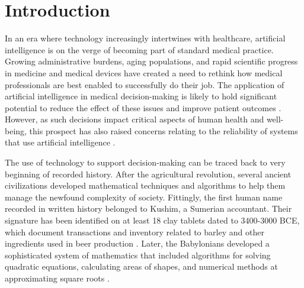 
\chapter[introduction]{Introduction}\label{chp:introduction}
%
%


In an era where technology increasingly intertwines with healthcare, artificial intelligence is on the verge of becoming part of standard medical practice. 
Growing administrative burdens, aging populations, and rapid scientific progress in medicine and medical devices have created a need to rethink how medical professionals are best enabled to successfully do their job. 
The application of artificial intelligence in medical decision-making is likely to hold significant potential to reduce the effect of these issues and improve patient outcomes \parencite{shailaja_machine_2018}. 
However, as such decisions impact critical aspects of human health and well-being, this prospect has also raised concerns relating to the reliability of systems that use artificial intelligence \parencite{chen_ethical_2021, ahmad_interpretable_2018}.

The use of technology to support decision-making can be traced back to very beginning of recorded history. After the agricultural revolution, several ancient civilizations developed mathematical techniques and algorithms to help them manage the newfound complexity of society. 
Fittingly, the first human name recorded in written history belonged to Kushim, a Sumerian accountant. Their signature has been identified on at least 18 clay tablets dated to 3400-3000 BCE, which document transactions and inventory related to barley and other ingredients used in beer production \parencite{nissen_archaic_1993}. 
Later, the Babylonians developed a sophisticated system of mathematics that included algorithms for solving quadratic equations, calculating areas of shapes, and numerical methods at approximating square roots \parencite{fowler_square_1998}. 

